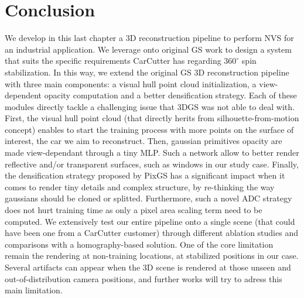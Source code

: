 \section{Conclusion}

We develop in this last chapter a 3D reconstruction pipeline to perform \ac{NVS} for an industrial application. We leverage onto original \ac{GS} \citep{kerbl20233d} work to design a system that suits the specific requirements CarCutter has regarding $360^{\circ}$ spin stabilization. In this way, we extend the original \ac{GS} 3D reconstruction pipeline with three main components: a visual hull point cloud initialization, a view-dependent opacity computation and a better densification strategy. Each of these modules directly tackle a challenging issue that 3DGS was not able to deal with. First, the visual hull point cloud (that directly herits from silhouette-from-motion concept) enables to start the training process with more points on the surface of interest, the car we aim to reconstruct. Then, gaussian primitives opacity are made view-dependant through a tiny MLP. Such a network allow to better render reflective and/or transparent surfaces, such as windows in our study case. Finally, the densification strategy proposed by PixGS \citep{zhang2024pixel} has a significant impact when it comes to render tiny details and complex structure, by re-thinking the way gaussians should be cloned or splitted. Furthermore, such a novel \ac{ADC} strategy does not hurt training time as only a pixel area scaling term need to be computed. We extensively test our entire pipeline onto a single scene (that could have been one from a CarCutter customer) through different ablation studies and comparisons with a homography-based solution. One of the core limitation remain the rendering at non-training locations, \ie at stabilized positions in our case. Several artifacts can appear when the 3D scene is rendered at those unseen and out-of-distribution camera positions, and further works will try to adress this main limitation. 



